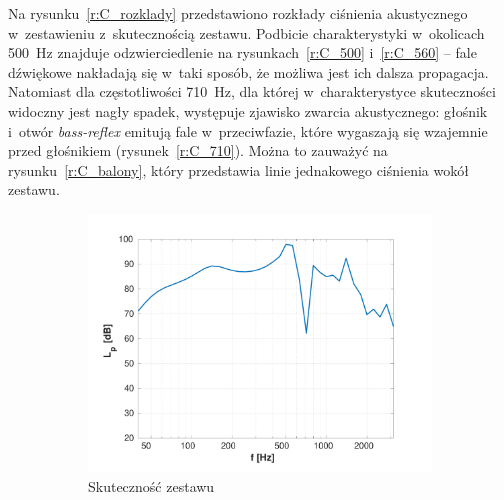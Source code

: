 \documentclass[12pt]{oska}
\begin{document}
	Na rysunku~\ref{r:C_rozklady} przedstawiono rozkłady ciśnienia akustycznego w~zestawieniu z~skutecznością zestawu. Podbicie charakterystyki w~okolicach \SI{500}{\hertz} znajduje odzwierciedlenie na rysunkach~\ref{r:C_500} i~\ref{r:C_560} -- fale dźwiękowe nakładają się w~taki sposób, że możliwa jest ich dalsza propagacja. Natomiast dla częstotliwości \SI{710}{\hertz}, dla której w~charakterystyce skuteczności widoczny jest nagły spadek, występuje zjawisko zwarcia akustycznego: głośnik i~otwór \textit{bass-reflex} emitują fale w~przeciwfazie, które wygaszają się wzajemnie przed głośnikiem (rysunek~\ref{r:C_710}). Można to zauważyć na rysunku~\ref{r:C_balony}, który przedstawia linie jednakowego ciśnienia wokół zestawu.
	
	\begin{figure}[!ht]
		\centering
		\begin{subfigure}[b]{.49\textwidth}
			\includegraphics[width=\textwidth,trim={1.25cm .5cm 2cm 1cm},clip]{skutecznosc_comsol.pdf}
			\caption{Skuteczność zestawu}
			\label{r:C_skutecznosc}
		\end{subfigure}
		~
		\begin{subfigure}[b]{.49\textwidth}

\end{subfigure}
\end{figure}
\end{document}
